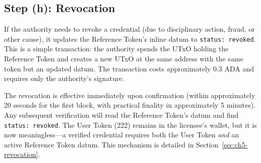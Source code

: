 \subsection{Step (h): Revocation}

If the authority needs to revoke a credential (due to disciplinary action, fraud, or other cause), it updates the Reference Token's inline datum to \texttt{status: revoked}. This is a simple transaction: the authority spends the UTxO holding the Reference Token and creates a new UTxO at the same address with the same token but an updated datum. The transaction costs approximately 0.3 ADA and requires only the authority's signature.

The revocation is effective immediately upon confirmation (within approximately 20 seconds for the first block, with practical finality in approximately 5 minutes). Any subsequent verification will read the Reference Token's datum and find \texttt{status: revoked}. The User Token (222) remains in the licensee's wallet, but it is now meaningless---a verified credential requires both the User Token \emph{and} an active Reference Token datum. This mechanism is detailed in Section~\ref{sec:ch5-revocation}.

